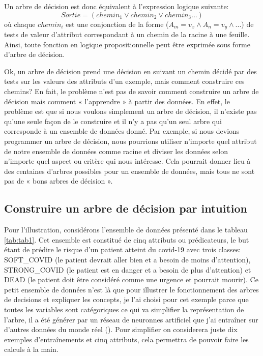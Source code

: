 Un arbre de décision est donc équivalent à l'expression logique suivante: \[Sortie =(chemin_1 \lor chemin_2 \lor chemin_3 ...)\] où chaque \(chemin_i\) est une conjonction de la forme (\(A_m = v_x \land A_n = v_y \land ...\)) de tests de valeur d'attribut correspondant à un chemin de la racine à une feuille. Ainsi, toute fonction en logique propositionnelle peut être exprimée sous forme d’arbre de décision.

Ok, un arbre de décision prend une décision en suivant un chemin décidé par des tests sur les valeurs des attributs d'un exemple, mais comment construire ces chemins? En fait, le problème n’est pas de savoir comment construire un arbre de décision mais comment « l’apprendre » à partir des données. En effet, le problème est que si nous voulons simplement un arbre de décision, il n’existe pas qu’une seule façon de le construire et il n’y a pas qu’un seul arbre qui corresponde à un ensemble de données donné. Par exemple, si nous devions programmer un arbre de décision, nous pourrions utiliser n'importe quel attribut de notre ensemble de données comme racine et diviser les données selon n'importe quel aspect ou critère qui nous intéresse. Cela pourrait donner lieu à des centaines d’arbres possibles pour un ensemble de données, mais tous ne sont pas de « bons arbres de décision ».

\subsection{Construire un arbre de décision par intuition}
\label{chap4.sec2.sub1}
Pour l'illustration, considérons l'ensemble de données présenté dans le tableau \ref{tab:tab1}. Cet ensemble est constitué de cinq attributs ou prédicateurs, le but étant de prédire le risque d'un patient atteint du covid-19 avec trois classes: SOFT\_COVID (le patient devrait aller bien et a besoin de moins d'attention), STRONG\_COVID (le patient est en danger et a besoin de plus d'attention) et DEAD (le patient doit être considéré comme une urgence et pourrait mourir). Ce petit ensemble de données n'est là que pour illustrer le fonctionnement des arbres de decisions et expliquer les concepts, je l'ai choisi pour cet exemple parce que toutes les variables sont catégoriques ce qui va simplifier la représentation de l'arbre, il a été générer par un réseau de neuronnes artificiel que j'ai entraîner sur d'autres données du monde réel (\cite{diarra2023covid}). Pour simplifier on considerera juste dix exemples d'entraînements et cinq attributs, cela permettra de pouvoir faire les calculs à la main.

